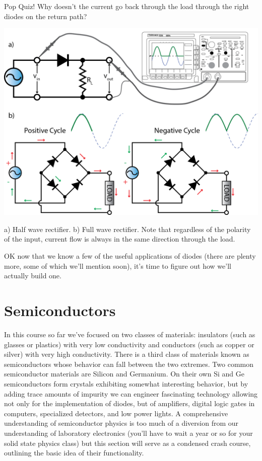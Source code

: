 \documentclass{tufte-book}
\begin{document}
\begin{myexample}[label = ex:welches_wegen_diode]{Pop Quiz!}
Why doesn't the current go back through the load through the right diodes on the return path?
\end{myexample}

\begin{marginfigure}%
  \includegraphics[]{rectification_half_full}
  \caption{a) Half wave rectifier. b) Full wave rectifier. Note that regardless of the polarity of the input, current flow is always in the same direction through the load.}
  \label{fig:rect_half_full}
\end{marginfigure}


OK now that we know a few of the useful applications of diodes (there are plenty more, some of which we'll mention soon), it's time to figure out how we'll actually build one. 

\section{Semiconductors}
In this course so far we've focused on two classes of materials: insulators (such as glasses or plastics) with very low conductivity and conductors (such as copper or silver) with very high conductivity. There is a third class of materials known as semiconductors whose behavior can fall between the two extremes. Two common semiconductor materials are Silicon and Germanium. On their own Si and Ge semiconductors form crystals exhibiting somewhat interesting behavior, but by adding trace amounts of impurity we can engineer fascinating technology allowing not only for the implementation of diodes, but of amplifiers, digital logic gates in computers, specialized detectors, and low power lights. A comprehensive understanding of semiconductor physics is too much of a diversion from our understanding of laboratory electronics (you'll have to wait a year or so for your solid state physics class) but this section will serve as a condensed crash course, outlining the basic idea of their functionality.
\end{document}

